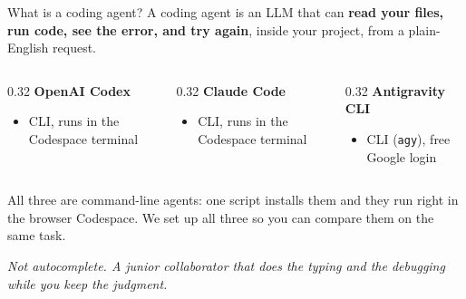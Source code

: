 \documentclass[aspectratio=169,11pt]{beamer}
\begin{document}
\begin{frame}{What is a coding agent?}
  A coding agent is an LLM that can \textbf{read your files, run code, see the error,
  and try again}, inside your project, from a plain-English request.

  \medskip
  \begin{columns}[T]
    \begin{column}{0.32\textwidth}
      \textbf{OpenAI Codex}
      \begin{itemize}
        \item CLI, runs in the Codespace terminal
      \end{itemize}
    \end{column}
    \begin{column}{0.32\textwidth}
      \textbf{Claude Code}
      \begin{itemize}
        \item CLI, runs in the Codespace terminal
      \end{itemize}
    \end{column}
    \begin{column}{0.32\textwidth}
      \textbf{Antigravity CLI}
      \begin{itemize}
        \item CLI (\texttt{agy}), free Google login
      \end{itemize}
    \end{column}
  \end{columns}
  \medskip
  All three are command-line agents: one script installs them and they run right in the
  browser Codespace. We set up all three so you can compare them on the same task.
  \vfill
  \begin{center}
    \itshape Not autocomplete. A junior collaborator that does the typing and the
    debugging while you keep the judgment.
  \end{center}
\end{frame}
\end{document}
